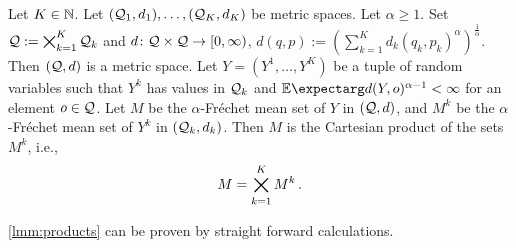 \begin{lemma}\label{lmm:products}
Let $K\in\mathbb{N}$. Let $(\mathcal{Q}_1, d_1), \dots, (\mathcal{Q}_K, d_K)$ be metric spaces. 
Let $\alpha\geq1$.
Set $\mathcal{Q} := \bigtimes_{k=1}^K \mathcal{Q}_k$ and $d \colon \mathcal{Q} \times \mathcal{Q} \to [0,\infty)$, $d(q,p) := (\sum_{k=1}^K d_k(q_k, p_k)^\alpha)^\frac1\alpha$. Then $(\mathcal{Q}, d)$ is a metric space. Let $Y = (Y^1, \dots, Y^K)$ be a tuple of random variables such that $Y^k$ has values in $\mathcal{Q}_k$ and $\Ex{d(Y,o)^{\alpha-1}} < \infty$ for an element $o\in\mathcal{Q}$. Let $M$ be the $\alpha$-Fréchet mean set of $Y$ in $(\mathcal{Q}, d)$, and $M^k$ be the $\alpha$-Fréchet mean set of $Y^k$ in $(\mathcal{Q}_k, d_k)$. Then $M$ is the Cartesian product of the sets $M^k$, i.e.,
\begin{equation*}
	M = \bigtimes_{k=1}^K M^k
	\, .
\end{equation*}
\end{lemma}
%
\autoref{lmm:products} can be proven by straight forward calculations.